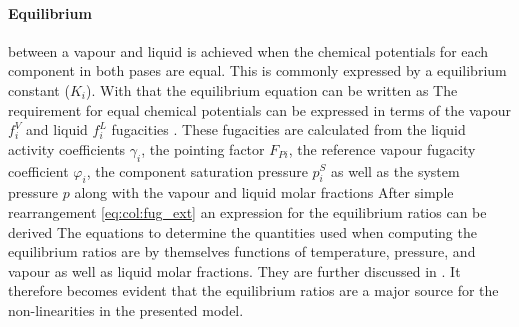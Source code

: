         \paragraph{Equilibrium} between a vapour and liquid is achieved when the chemical potentials for each
        component in both pases are equal. This is commonly expressed by a equilibrium constant ($K_i$). With
        that the equilibrium equation can be written as
        The requirement for equal chemical potentials can be expressed in terms of the vapour $f_i^V$
        and liquid $f_i^L$ fugacities \cite{AndreasPfennig.2003}.
        These fugacities are calculated from the liquid activity coefficients $\gamma_i$,
        the pointing factor $F_{Pi}$, the reference vapour fugacity coefficient $\varphi_i$,
        the component saturation pressure $p^S_i$ as well as the system pressure $p$ along
        with the vapour and liquid molar fractions
        After simple rearrangement \eqref{eq:col:fug_ext} an expression for the equilibrium ratios
        can be derived
        The equations to determine the quantities used when computing the equilibrium ratios are by
        themselves functions of temperature, pressure, and vapour as well as liquid molar fractions.
        They are further discussed in . It therefore becomes evident that the
        equilibrium ratios are a major source for the non-linearities in the presented model.

